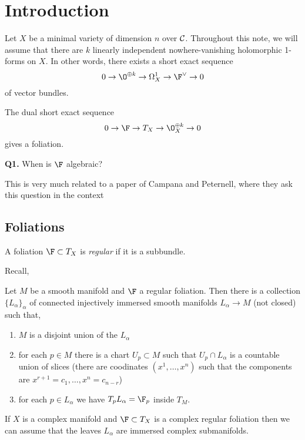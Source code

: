 \documentclass[12pt]{article}
\begin{document}
\section{Introduction}

Let $X$ be a minimal variety of dimension $n$ over $\mathcal{C}$. Throughout this note, we will assume that there are $k$ linearly independent nowhere-vanishing holomorphic 1-forms on $X$. In other words, there exists a short exact sequence
\[ 0 \rightarrow \O^{\oplus k} \rightarrow \Omega_{X}^{1} \rightarrow \F^{\vee} \rightarrow 0 \]
of vector bundles.

\begin{lemma}
The dual short exact sequence
\[ 0 \rightarrow \F \rightarrow T_{X} \rightarrow \O_{X}^{\oplus k} \rightarrow 0 \]
gives a foliation.
\end{lemma}

\textbf{Q1.} When is $\F$ algebraic?

This is very much related to a paper of Campana and Peternell, where they ask this question in the context

\subsection{Foliations}

\begin{defn}
A foliation $\F \subset T_X$ is \textit{regular} if it is a subbundle. 
\end{defn}

Recall,

\begin{theorem}[Frobenius]
Let $M$ be a smooth manifold and $\F$ a regular foliation. Then there is a collection $\{ L_\alpha \}_\alpha$ of connected injectively immersed smooth manifolds $L_\alpha \to M$ (not closed) such that,
\begin{enumerate}
\item $M$ is a disjoint union of the $L_\alpha$
\item for each $p \in M$ there is a chart $U_p \subset M$ such that $U_p \cap L_\alpha$ is a countable union of slices (there are coodinates $(x^1, \dots, x^n)$ such that the components are $x^{r+1} = c_1, \dots, x^n = c_{n-r}$)
\item for each $p \in L_\alpha$ we have $T_p L_\alpha = \F_p$ inside $T_M$.
\end{enumerate}
If $X$ is a complex manifold and $\F \subset T_X$ is a complex regular foliation then we can assume that the leaves $L_\alpha$ are immersed complex submanifolds. 
\end{theorem}
\end{document}
